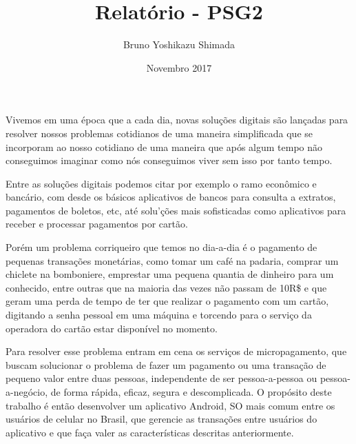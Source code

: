 \documentclass[hidelinks,12pt]{article}
\title{Relat\'orio - PSG2}
\author{Bruno Yoshikazu Shimada}
\date{Novembro 2017}
\begin{document}
\maketitle

\newpage
{}
\section*{}

Vivemos em uma \'epoca que a cada dia, novas solu\c{c}\~oes digitais s\~ao lan\c{c}adas para resolver nossos problemas cotidianos de uma maneira simplificada que se incorporam ao nosso cotidiano de uma maneira que ap\'os algum tempo n\~ao conseguimos imaginar como n\'os conseguimos viver sem isso por tanto tempo.

Entre as solu\c{c}\~oes digitais podemos citar por exemplo o ramo econ\^omico e banc\'ario, com desde os b\'asicos aplicativos de bancos para consulta a extratos, pagamentos de boletos, etc, at\'e solu'\c{c}\~oes mais sofisticadas como aplicativos para receber e processar pagamentos por cart\~ao.

Por\'em um problema corriqueiro que temos no dia-a-dia \'e o pagamento de pequenas transa\c{c}\~oes monet\'arias, como tomar um caf\'e na padaria, comprar um chiclete na bomboniere, emprestar uma pequena quantia de dinheiro para um conhecido, entre outras que na maioria das vezes n\~ao passam de 10R\$ e que geram uma perda de tempo de ter que realizar o pagamento com um cart\~ao, digitando a senha pessoal em uma m\'aquina e torcendo para o servi\c{c}o da operadora do cart\~ao estar disponível no momento.

Para resolver esse problema entram em cena os servi\c{c}os de micropagamento, que buscam solucionar o problema de fazer um pagamento ou uma transa\c{c}\~ao de pequeno valor entre duas pessoas, independente de ser pessoa-a-pessoa ou pessoa-a-neg\'ocio, de forma r\'apida, eficaz, segura e descomplicada. O prop\'osito deste trabalho \'e ent\~ao desenvolver um aplicativo Android, SO mais comum entre os usu\'arios de celular no Brasil, que gerencie as transações entre usu\'arios do aplicativo e que fa\c{c}a valer as caracter\'isticas descritas anteriormente.
\newline
\end{document}
